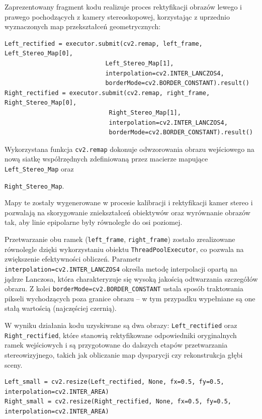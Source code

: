 \documentclass[magisterska]{pracadypl}
\begin{document}
Zaprezentowany fragment kodu realizuje proces rektyfikacji obrazów lewego i prawego pochodzących z kamery stereoskopowej, korzystając z uprzednio wyznaczonych map przekształceń geometrycznych:

\begin{lstlisting}[style=mypython]
Left_rectified = executor.submit(cv2.remap, left_frame, Left_Stereo_Map[0], 
                            Left_Stereo_Map[1],
                            interpolation=cv2.INTER_LANCZOS4,
                            borderMode=cv2.BORDER_CONSTANT).result()
Right_rectified = executor.submit(cv2.remap, right_frame, Right_Stereo_Map[0],
                             Right_Stereo_Map[1],
                             interpolation=cv2.INTER_LANCZOS4, 
                             borderMode=cv2.BORDER_CONSTANT).result()
\end{lstlisting}

Wykorzystana funkcja \texttt{cv2.remap} dokonuje odwzorowania obrazu wejściowego na nową siatkę współrzędnych zdefiniowaną przez macierze mapujące \texttt{Left\_Stereo\_Map} oraz {\sloppy \texttt{Right\_Stereo\_Map}. \par} Mapy te zostały wygenerowane w procesie kalibracji i rektyfikacji kamer stereo i pozwalają na skorygowanie zniekształceń obiektywów oraz wyrównanie obrazów tak, aby linie epipolarne były równoległe do osi poziomej.  

Przetwarzanie obu ramek (\texttt{left\_frame}, \texttt{right\_frame}) zostało zrealizowane równolegle dzięki wykorzystaniu obiektu \texttt{ThreadPoolExecutor}, co pozwala na zwiększenie efektywności obliczeń. Parametr \texttt{interpolation=cv2.INTER\_LANCZOS4} określa metodę interpolacji opartą na jądrze Lanczosa, która charakteryzuje się wysoką jakością odtwarzania szczegółów obrazu. Z kolei \texttt{borderMode=cv2.BORDER\_CONSTANT} ustala sposób traktowania pikseli wychodzących poza granice obrazu – w tym przypadku wypełniane są one stałą wartością (najczęściej czernią).  

W wyniku działania kodu uzyskiwane są dwa obrazy: \texttt{Left\_rectified} oraz \texttt{Right\_rectified}, które stanowią rektyfikowane odpowiedniki oryginalnych ramek wejściowych i są przygotowane do dalszych etapów przetwarzania stereowizyjnego, takich jak obliczanie map dysparycji czy rekonstrukcja głębi sceny.

\begin{lstlisting}[style=mypython]
Left_small = cv2.resize(Left_rectified, None, fx=0.5, fy=0.5, interpolation=cv2.INTER_AREA)
Right_small = cv2.resize(Right_rectified, None, fx=0.5, fy=0.5, interpolation=cv2.INTER_AREA)
\end{lstlisting}
\end{document}
